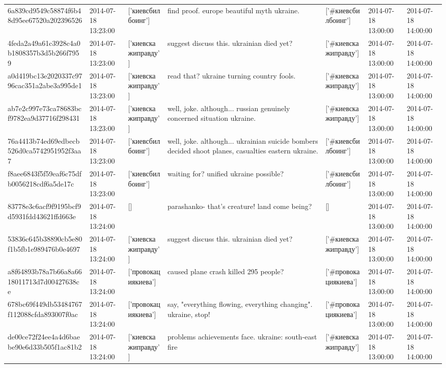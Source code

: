 \begin{tabular}{lllllll}
6a839cd9549c58874f6b48d95ee67520a202396526 & 2014-07-18 13:23:00 & ['киевсбилбоинг'] & find proof. europe beautiful myth ukraine. & ['#киевсбилбоинг'] & 2014-07-18 13:00:00 & 2014-07-18 14:00:00 \\
4feda2a49a61c3928c4a0b1808357b3d5b266f7959 & 2014-07-18 13:23:00 & ['киевскажиправду'] & suggest discuss this. ukrainian died yet? & ['#киевскажиправду'] & 2014-07-18 13:00:00 & 2014-07-18 14:00:00 \\
a0d419bc13e2020337c9796cac351a2abe3a995de1 & 2014-07-18 13:23:00 & ['киевскажиправду'] & read that? ukraine turning country fools. & ['#киевскажиправду'] & 2014-07-18 13:00:00 & 2014-07-18 14:00:00 \\
ab7e2c997e73ca78683bcf9782ea9d37716f298431 & 2014-07-18 13:23:00 & ['киевскажиправду'] & well, joke. although... russian genuinely concerned situation ukraine. & ['#киевскажиправду'] & 2014-07-18 13:00:00 & 2014-07-18 14:00:00 \\
76a4413b74ed69edbecb526d0ca5742951952f3aa7 & 2014-07-18 13:23:00 & ['киевсбилбоинг'] & well, joke. although... ukrainian suicide bombers decided shoot planes, casualties eastern ukraine. & ['#киевсбилбоинг'] & 2014-07-18 13:00:00 & 2014-07-18 14:00:00 \\
f8aee6843f5f59eaf6c75dfb0056218cdf6a5de17c & 2014-07-18 13:23:00 & ['киевсбилбоинг'] & waiting for? unified ukraine possible? & ['#киевсбилбоинг'] & 2014-07-18 13:00:00 & 2014-07-18 14:00:00 \\
83778e3c6acf9f9195bcf9d5931fdd43621ffd663e & 2014-07-18 13:24:00 & [] & parashanko- that's creature! land come being? & [] & 2014-07-18 13:00:00 & 2014-07-18 14:00:00 \\
53836c645b38890cb5e80f1b5fb1e989476b0e4697 & 2014-07-18 13:24:00 & ['киевскажиправду'] & suggest discuss this. ukrainian died yet? & ['#киевскажиправду'] & 2014-07-18 13:00:00 & 2014-07-18 14:00:00 \\
a8f64893b78a7b66a8a6618011713d7d00427638ce & 2014-07-18 13:24:00 & ['провокациякиева'] & caused plane crash killed 295 people? & ['#провокациякиева'] & 2014-07-18 13:00:00 & 2014-07-18 14:00:00 \\
678bc69f449db53484767f112088cfda893007f0ac & 2014-07-18 13:24:00 & ['провокациякиева'] & say, "everything flowing, everything changing". ukraine, stop! & ['#провокациякиева'] & 2014-07-18 13:00:00 & 2014-07-18 14:00:00 \\
de00ce72f24ee4a4d6baebe90e6d33b505f1ac81b2 & 2014-07-18 13:24:00 & ['киевскажиправду'] & problems achievements face. ukraine: south-east fire & ['#киевскажиправду'] & 2014-07-18 13:00:00 & 2014-07-18 14:00:00 \\

\end{tabular}
